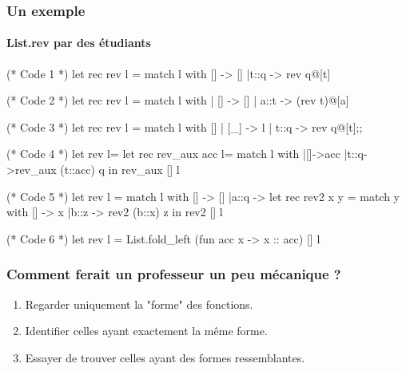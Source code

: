 \documentclass[11pt]{beamer}
\newenvironment{tinyocaml}
{\small\VerbatimEnvironment
	\begin{mytinyocaml}}
	{\end{mytinyocaml}}
\begin{document}
\begin{frame}[fragile]
	\frametitle{Un exemple}
	\framesubtitle{List.rev par des étudiants}

\begin{multicols}{2}
\begin{tinyocaml}
	
	
(* Code 1 *)
let rec rev l = match l with
  [] -> []
  |t::q -> rev q@[t]

(* Code 2 *)
let rec rev l = match l with
  | [] -> []
  | a::t -> (rev t)@[a]

(* Code 3 *)
let rec rev l = match l with
  [] | [_] -> l
  | t::q -> rev q@[t];;
\end{tinyocaml}
\columnbreak
\begin{tinyocaml}
(* Code 4 *)
let rev l=
  let rec rev_aux acc l= match l with
    |[]->acc
    |t::q->rev_aux (t::acc) q
  in rev_aux [] l

(* Code 5 *)
let rev l = match l with
  [] -> []
  |a::q ->
    let rec rev2 x y = match y with
    [] -> x
    |b::z -> rev2 (b::x) z in rev2 [] l

(* Code 6 *)
let rev l = List.fold_left
    (fun acc x -> x :: acc) [] l
\end{tinyocaml}
\end{multicols}

\end{frame}

\begin{frame}
	\frametitle{Comment ferait un professeur un peu mécanique ?}
\begin{enumerate}
\item Regarder uniquement la "forme" des fonctions.
\item Identifier celles ayant exactement la même forme.
\item Essayer de trouver celles ayant des formes ressemblantes.
\end{enumerate}
\end{frame}
\end{document}
